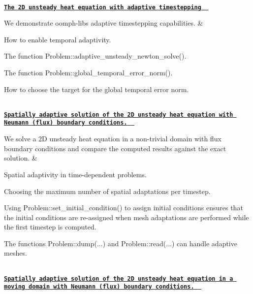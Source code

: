 \begin{longtabu}
\\
\href{../../unsteady_heat/two_d_unsteady_heat_t_adapt/html/index.html}{\tt {\bfseries  The 2D unsteady heat equation with adaptive timestepping } }

We demonstrate {\ttfamily oomph-\/lib\textquotesingle{}s} adaptive timestepping capabilities.  &
\begin{DoxyItemize}
\item How to enable temporal adaptivity.
\item The function {\ttfamily Problem\+::adaptive\+\_\+unsteady\+\_\+newton\+\_\+solve()}.
\item The function {\ttfamily Problem\+::global\+\_\+temporal\+\_\+error\+\_\+norm()}.
\item How to choose the target for the global temporal error norm. 
\end{DoxyItemize}

\\
\href{../../unsteady_heat/two_d_unsteady_heat_adapt/html/index.html}{\tt {\bfseries  Spatially adaptive solution of the 2D unsteady heat equation with Neumann (flux) boundary conditions. } }

We solve a 2D unsteady heat equation in a non-\/trivial domain with flux boundary conditions and compare the computed results against the exact solution.  &
\begin{DoxyItemize}
\item Spatial adaptivity in time-\/dependent problems.
\item Choosing the maximum number of spatial adaptations per timestep.
\item Using {\ttfamily Problem\+::set\+\_\+initial\+\_\+condition()} to assign initial conditions ensures that the initial conditions are re-\/assigned when mesh adaptations are performed while the first timestep is computed.
\item The functions {\ttfamily Problem\+::dump}(...) and {\ttfamily Problem\+::read}(...) can handle adaptive meshes. 
\end{DoxyItemize}

\\
\href{../../unsteady_heat/two_d_unsteady_heat_ALE/html/index.html}{\tt {\bfseries  Spatially adaptive solution of the 2D unsteady heat equation in a moving domain with Neumann (flux) boundary conditions. } }


\end{longtabu}
